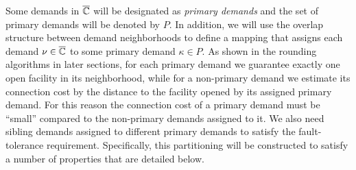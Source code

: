 \documentclass{llncs}
\begin{document}
Some demands in $\overline{\mathbb{C}}$ will be designated as
\emph{primary demands} and the set of primary demands will
be denoted by $P$. In addition, we will use the overlap
structure between demand neighborhoods to define a mapping
that assigns each demand $\nu\in\overline{\mathbb{C}}$ to some primary
demand $\kappa\in P$. As shown in the rounding algorithms in
later sections, for each primary demand we guarantee exactly
one open facility in its neighborhood, while for a
non-primary demand we estimate its
connection cost by the distance to the facility opened by
its assigned primary demand. For this reason
the connection cost of a primary demand must be ``small''
compared to the non-primary demands assigned to it. We also
need sibling demands assigned to different primary demands to satisfy
the fault-tolerance requirement. Specifically, this
partitioning will be constructed to satisfy a number of
properties that are detailed below.
%
\end{document}
